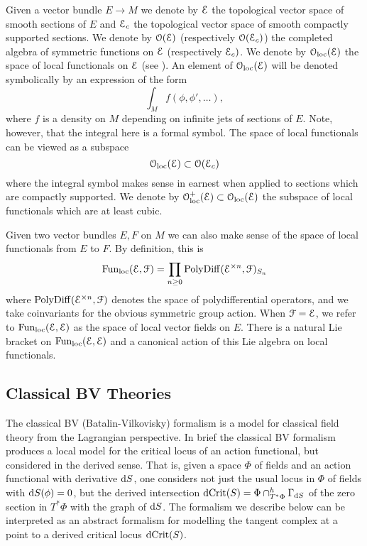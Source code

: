 \documentclass[10pt, oneside]{article}
\begin{document}
Given a vector bundle $E\rightarrow M$ we denote by $\mathcal E$ the topological vector space of smooth sections of $E$ and $\mathcal E_c$ the topological vector space of smooth compactly supported sections.
We denote by $\mathcal O(\mathcal E)$ (respectively $\mathcal O(\mathcal E_c)$) the completed algebra of symmetric functions on $\mathcal E$ (respectively $\mathcal E_c)$. 
We denote by $\mathcal{O}_{\rm loc}(\mathcal E)$ the space of local functionals on $\mathcal E$ (see \cite[Definition 4.5.1.1]{Book2}). An element of $\mathcal{O}_{\rm loc}(\mathcal E)$ will be denoted symbolically by an expression of the form
\[\int_M f (\phi, \phi', \dots),\]
where $f$ is a density on $M$ depending on infinite jets of sections of $E$. Note, however, that the integral here is a formal symbol. 
The space of local functionals can be viewed as a subspace
\[
\mathcal{O}_{\rm loc}(\mathcal E) \subset \mathcal O(\mathcal E_c)
\]
where the integral symbol makes sense in earnest when applied to sections which are compactly supported.
We denote by $\mathcal{O}_{\rm loc}^+(\mathcal E)\subset \mathcal{O}_{\rm loc}(\mathcal E)$ the subspace of local functionals which are at least cubic.

Given two vector bundles $E, F$ on $M$ we can also make sense of the space of local functionals from $E$ to $F$.
By definition, this is 
\[
{\rm Fun}_{\rm loc}(\mathcal E, \mathcal F) = \prod_{n \geq 0} {\rm PolyDiff}(\mathcal E^{\times n}, \mathcal F)_{S_n}
\]
where ${\rm PolyDiff}(\mathcal E^{\times n}, \mathcal F)$ denotes the space of polydifferential operators, and we take coinvariants for the obvious symmetric group action.
When $\mathcal F = \mathcal E$, we refer to ${\rm Fun}_{\rm loc}(\mathcal E, \mathcal E)$ as the space of local vector fields on $E$. 
There is a natural Lie bracket on ${\rm Fun}_{\rm loc}(\mathcal E, \mathcal E)$ and a canonical action of this Lie algebra on local functionals. 

\subsection{Classical BV Theories}

The classical BV (Batalin-Vilkovisky) formalism \cite{BatalinVilkovisky} is a model for classical field theory from the Lagrangian perspective.  In brief the classical BV formalism produces a local model for the critical locus of an action functional, but considered in the derived sense.  That is, given a space $\Phi$ of fields and an action functional with derivative ${\rm d} S$, one considers not just the usual locus in $\Phi$ of fields with ${\rm d} S(\phi) = 0$, but the derived intersection $\mathrm{dCrit}(S) = \Phi \cap^h_{T^*\Phi} \Gamma_{{\rm d} S}$ of the zero section in $T^*\Phi$ with the graph of ${\rm d} S$.  The formalism we describe below can be interpreted as an abstract formalism for modelling the tangent complex at a point to a derived critical locus $\mathrm{dCrit}(S)$.
\end{document}
